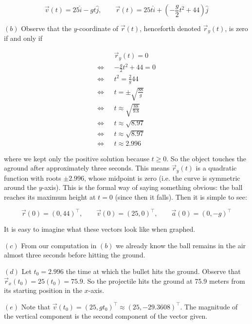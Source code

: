 \documentclass[12pt]{article}
\theoremstyle{definition}
\begin{document}
\begin{equation*}
    \vec{v}(t) = 25\hat{i} - gt \hat{j}, \qquad \vec{r}(t) = 25t \hat{i} +
    \left( -\frac{g}{2}t^2 + 44 \right) \hat{j}
\end{equation*}

$(b)$ Observe that the $y$-coordinate of $\vec{r}(t)$, henceforth denoted
$\vec{r}_y(t)$, is zero if and only if

\begin{align*}
    &\vec{r}_y(t) = 0 \\ 
    \iff ~ ~ ~ &-\frac{g}{2}t^2 + 44 = 0 \\ 
    \iff ~ ~ ~ & t^2 = \frac{2}{g}44\\
    \iff ~ ~ ~ & t = \pm \sqrt{\frac{88}{g}}  \\ 
    \iff ~ ~ ~ & t \approx \sqrt{\frac{88}{9.8}}  \\ 
    \iff ~ ~ ~ & t \approx \sqrt{8.97}  \\ 
    \iff ~ ~ ~ & t \approx \sqrt{8.97}  \\ 
    \iff ~ ~ ~ & t \approx 2.996 
\end{align*}

where we kept only the positive solution because $t \geq 0$. So the object
touches the aground after approximately three seconds. This means $\vec{r}_y(t)$
is a quadratic function with roots $\pm 2.996$, whose midpoint is zero (i.e. the
curve is symmetric around the $y$-axis). This is the formal way of saying
something obvious: the ball reaches its maximum height at $t = 0$ (since then it
falls). Then it is simple to see: 

\begin{equation*}
    \vec{r}(0) = (0, 44)^\top, \qquad \vec{v}(0) = (25, 0)^\top, \qquad
    \vec{a}(0) = (0, -g)^\top
\end{equation*}

It is easy to imagine what these vectors look like when graphed.

$(c)$ From our computation in $(b)$ we already know the ball remains in the air
almost three seconds before hitting the ground.

$(d)$ Let $t_0 = 2.996$ the time at which the bullet hits the ground. Observe
that $\vec{r}_x(t_0) = 25(t_0) = 75.9$. So the projectile hits the ground at
75.9 meters from its starting position in the $x$-axis.

$(e)$ Note that $\vec{v}(t_0) = (25, gt_0)^\top \approx (25, -29.3608)^\top$. The
magnitude of the vertical component is the second component of the vector given.
\pagebreak 
\end{document}
